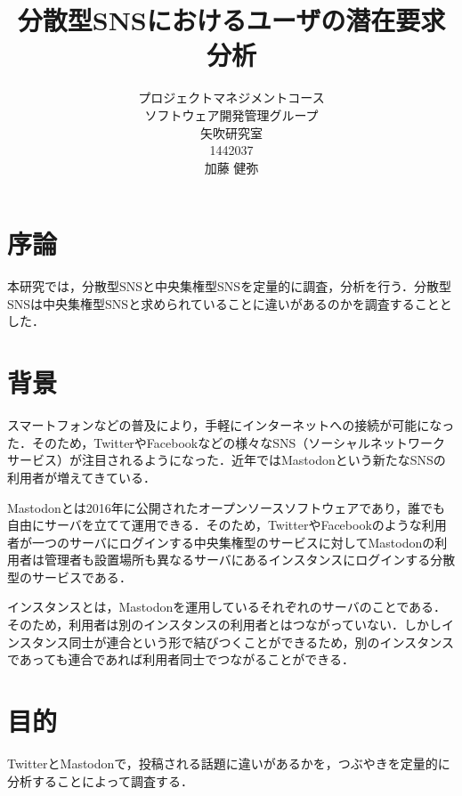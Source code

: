 \title{分散型SNSにおけるユーザの潜在要求分析}
\author{プロジェクトマネジメントコース\\
ソフトウェア開発管理グループ\\
矢吹研究室\\
1442037\\
加藤 健弥}
\date{}
\usepackage{listings}

\maketitle



\tableofcontents%

\chapter{序論}
本研究では，分散型SNSと中央集権型SNSを定量的に調査，分析を行う．分散型SNSは中央集権型SNSと求められていることに違いがあるのかを調査することとした．
\chapter{背景}
スマートフォンなどの普及により，手軽にインターネットへの接続が可能になった．そのため，TwitterやFacebookなどの様々なSNS（ソーシャルネットワークサービス）が注目されるようになった．近年ではMastodonという新たなSNSの利用者が増えてきている．

Mastodonとは2016年に公開されたオープンソースソフトウェアであり，誰でも自由にサーバを立てて運用できる．そのため，TwitterやFacebookのような利用者が一つのサーバにログインする中央集権型のサービスに対してMastodonの利用者は管理者も設置場所も異なるサーバにあるインスタンスにログインする分散型のサービスである\cite{mas}．

インスタンスとは，Mastodonを運用しているそれぞれのサーバのことである．そのため，利用者は別のインスタンスの利用者とはつながっていない．しかしインスタンス同士が連合という形で結びつくことができるため，別のインスタンスであっても連合であれば利用者同士でつながることができる\cite{Mastodon}．
\chapter{目的}
TwitterとMastodonで，投稿される話題に違いがあるかを，つぶやきを定量的に分析することによって調査する．
